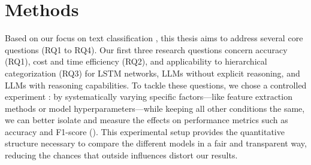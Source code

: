 \section{Methods}
%
%
%

Based on our focus on text classification , this thesis aims to address several core questions (RQ1 to RQ4). Our first three research questions concern accuracy (RQ1), cost and time efficiency (RQ2), and applicability to hierarchical categorization (RQ3) for LSTM networks, LLMs without explicit reasoning, and LLMs with reasoning capabilities. To tackle these questions, we chose a controlled experiment : by systematically varying specific factors—like feature extraction methods or model hyperparameters—while keeping all other conditions the same, we can better isolate and measure the effects on performance metrics such as accuracy and F1-score (\cite{wohlin2000software}). This experimental setup provides the quantitative structure necessary to compare the different models in a fair and transparent way, reducing the chances that outside influences distort our results.

